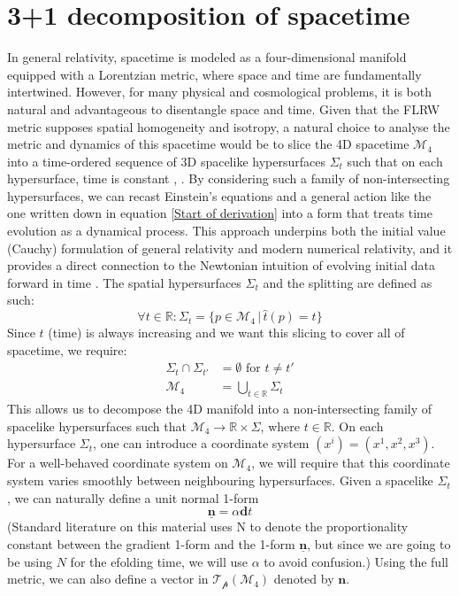 \documentclass[aps,prd,reprint,preprintnumbers,showpacs,floatfix,nofootinbib,superscript address]{revtex4-2}
\begin{document}
\section{3+1 decomposition of spacetime} \label{3+1 decomposition of spacetime}
In general relativity, spacetime is modeled as a four-dimensional manifold equipped with a Lorentzian metric, where space and time are fundamentally intertwined. However, for many physical and cosmological problems, it is both natural and advantageous to disentangle space and time. Given that the FLRW metric supposes spatial homogeneity and isotropy, a natural choice to analyse the metric and dynamics of this spacetime would be to slice the 4D spacetime $\mathcal{M}_4$ into a time-ordered sequence of 3D spacelike hypersurfaces $\Sigma_t$ such that on each hypersurface, time is constant \cite{baumann2012tasilecturesinflation}, 
\cite{gourgoulhon_31_2007}. By considering such a family of non-intersecting hypersurfaces, we can recast Einstein's equations and a general action like the one written down in equation \cref{Start of derivation} into a form that treats time evolution as a dynamical process. This approach underpins both the initial value (Cauchy) formulation of general relativity and modern numerical relativity, and it provides a direct connection to the Newtonian intuition of evolving initial data forward in time \cite{choquet-bruhat_global_1969}. The spatial hypersurfaces $\Sigma_t$ and the splitting are defined as such:
\begin{equation}
    \forall t \in \mathbb{R} : \Sigma_t = \{p \in \mathcal{M}_4 \, | \, \hat{t} (p) = t\} \nonumber
\end{equation}
Since $t$ (time) is always increasing and we want this slicing to cover all of spacetime, we require:
\begin{align}
    \Sigma_t \cap \Sigma_{t'} &= \emptyset \,\, \text{for}\,\, t \neq t' \nonumber \\
    \mathcal{M}_4 &= \bigcup_{t \in \mathbb{R}} \Sigma_t \nonumber
\end{align}
This allows us to decompose the 4D manifold into a non-intersecting family of spacelike hypersurfaces such that $\mathcal{M}_4 \rightarrow \mathbb{R} \times \Sigma$, where $t \in \mathbb{R}$. On each hypersurface $\Sigma_t$, one can introduce a coordinate system $(x^i) = (x^1,x^2,x^3)$. For a well-behaved coordinate system on $\mathcal{M}_4$, we will require that this coordinate system varies smoothly between neighbouring hypersurfaces. Given a spacelike $\Sigma_t$, we can naturally define a unit normal 1-form 
\begin{equation} \label{unit 1-form}
    \underline{\bm{n}} =  \alpha \textbf{d}t    
\end{equation}
(Standard literature on this material uses N to denote the proportionality constant between the gradient 1-form and the 1-form $\underline{\bm{n}}$, but since we are going to be using $N$ for the efolding time, we will use $\alpha$ to avoid confusion.) Using the full metric, we can also define a vector in $\mathcal{T_p}(\mathcal{M}_4)$ denoted by $\bm{n}$.
\end{document}
